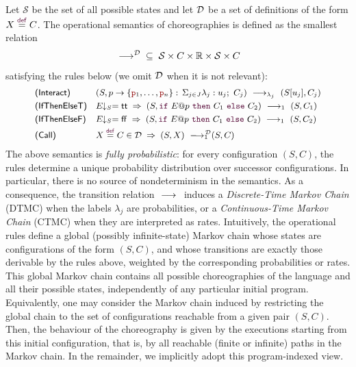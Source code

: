 Let $\mathcal S$ be the set of all possible states and let $\mathcal D$ be
a set of definitions of the form
$X \stackrel{\textcolor{sh_keyword}{\mathsf{def}}}{=} C$. The
operational semantics of choreographies is defined as the smallest
relation
\[
  \ \longrightarrow_{}\ \!\!\!\!^{\mathcal D} \;\subseteq\; \mathcal S \times C \times
  \mathbb R \times \mathcal S \times C
\]
satisfying the rules below (we omit $\mathcal D$ when it is not relevant):
\begin{displaymath}\small
  \begin{array}{l@{\quad}llll}
    \textsf{(Interact)} &
                          (S, \interact{p}{\role p_1,\ldots,\role p_n})
                          \red{\lambda_j}
                          (S[u_j], C_j)
    \\[1mm]
    \textsf{(IfThenElseT)} &
                             \eval E S = \mathsf{tt} \;\Rightarrow\;
                             (S,\ifTE{E}{p}{C_1}{C_2})
                             \red{1}
                             (S, C_1)
    \\[1mm]
    \textsf{(IfThenElseF)} &
                             \eval E S = \mathsf{ff} \;\Rightarrow\;
                             (S,\ifTE{E}{p}{C_1}{C_2})
                             \red{1}
                             (S, C_2)
    \\[1mm]
    \textsf{(Call)} &
                      X \stackrel{\textcolor{sh_keyword}{\mathsf{def}}}{=} C \in \defin
                      \;\Rightarrow\;
                      (S, X) \red{{1}}^{\!\!\!\!\!\!\!\defin} (S, C)
  \end{array}
\end{displaymath}
%
The above semantics is \emph{fully probabilistic}: for every
configuration $(S,C)$, the rules determine a unique probability
distribution over successor configurations. In particular, there is
no source of nondeterminism in the semantics. As a consequence, the
transition relation $\ \longrightarrow_{}\ $ induces a \emph{Discrete-Time Markov
Chain} (DTMC) when the labels $\lambda_j$ are probabilities, or a
\emph{Continuous-Time Markov Chain} (CTMC) when they are interpreted
as rates.
%
Intuitively, the operational rules define a global (possibly
infinite-state) Markov chain whose states are configurations of the
form $(S,C)$, and whose transitions are exactly those derivable by the
rules above, weighted by the corresponding probabilities or rates.
This global Markov chain contains all possible choreographies of the
language and all their possible states, independently of any
particular initial program.
%
Equivalently, one may consider the Markov chain induced by restricting
the global chain to the set of configurations reachable from a given
pair $(S,C)$. Then, the behaviour of the choreography is given by the
executions starting from this initial configuration, that is, by all
reachable (finite or infinite) paths in the Markov chain. In the
remainder, we implicitly adopt this program-indexed view.


